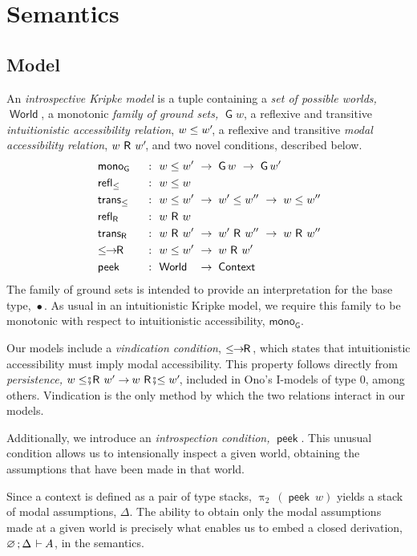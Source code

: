 \documentclass[submission,copyright,creativecommons,sharealike,backref=page]{eptcs}
\newcommand{\sA}{\mkern-2muA}
\newcommand{\R}{\mathrel{\rlap{$\mkern.75mu\textsf{R}$}\hphantom{\subseteq}}}
\newcommand{\Rs}{\mathrel{\textsf{R}}}
\renewcommand{\:}{\mathop{\mkern3mu:\mkern3mu}}
\renewcommand{\.}{\mathop{\mkern3mu.\mkern3mu}}
\renewcommand{\;}{\mathop{;}}
\renewcommand{\,}{\mathop{,}}
\newcommand{\e}{\mathrel{\mkern2mu\vdash\mkern1mu}}
\renewcommand{\r}{\mathrel{\rightarrow\mkern-1mu}}
\newcommand{\peek}{\operatorname{\textsf{peek}}}
\newcommand{\piii}{\operatorname{\uppi_{\scriptscriptstyle{2}}}}
\newcommand{\reflle}{\operatorname{\textsf{refl}_{\le}}}
\newcommand{\reflR}{\operatorname{\textsf{refl}_{\Rs}}}
\newcommand{\transle}{\operatorname{\textsf{trans}_{\le}}}
\newcommand{\transR}{\operatorname{\textsf{trans}_{\Rs}}}
\newcommand{\s}{\fatsemi}
\newcommand{\Rsle}{\mathrel{\R\mkern-4mu\s\mkern-4mu\le}}
\newcommand{\lesR}{\mathrel{\le\mkern-4mu\s\mkern-4mu\R}}
\newcommand{\lerR}{\operatorname{\le\mkern-1mu\r\mkern-1mu\R}}
\newcommand{\Context}{\operatorname{\textsf{Context}}}
\newcommand{\World}{\operatorname{\textsf{World}}}
\newcommand{\G}{\operatorname{\textsf{G}}}
\newcommand{\monoG}{\operatorname{\textsf{mono}_{\G}}}
\newcommand{\base}{\mathop{\bullet}}
\renewcommand{\O}{\varnothing}
\theoremstyle{mystyle}
\begin{document}
\section{Semantics}\label{Semantics}

\subsection{Model}

An \emph{introspective Kripke model} is a tuple containing a \emph{set of possible worlds,} $\World$, a monotonic \emph{family of ground sets,} $\G w$, a reflexive and transitive \emph{intuitionistic accessibility relation}, $w \le w'\mkern-3mu$, a reflexive and transitive \emph{modal accessibility relation}, $w \R w'\mkern-3mu$, and two novel conditions, described below.
\begin{alignat*}{2}
  & \monoG   && ~\:~ w \le w' ~\r~ \G w ~\r~ \G w'\\
  & \reflle  && ~\:~ w \le w\\
  & \transle && ~\:~ w \le w' ~\r~ w' \le w'' ~\r~ w \le w''\\
  & \reflR   && ~\:~ w \R w\\
  & \transR  && ~\:~ w \R w' ~\r~ w' \R w'' ~\r~ w \R w''\\
  & \lerR    && ~\:~ w \le w' ~\r~ w \R w'\\
  & \peek    && ~\:~ \rlap{$\World$}\hphantom{w \le w'} ~\r~ \Context
\end{alignat*}
The family of ground sets is intended to provide an interpretation for the base type, $\base$.  As usual in an intuitionistic Kripke model, we require this family to be monotonic with respect to intuitionistic accessibility, $\monoG$.

Our models include a \emph{vindication condition}, $\lerR$, which states that intuitionistic accessibility must imply modal accessibility.  This property follows directly from \emph{persistence,} $w \lesR w' \r w \Rsle w'\mkern-3mu$, included in Ono's\cite{Ono77} I-models of type 0, among others.  Vindication is the only method by which the two relations interact in our models.

Additionally, we introduce an \emph{introspection condition,} $\peek$.  This unusual condition allows us to intensionally inspect a given world, obtaining the assumptions that have been made in that world.

Since a context is defined as a pair of type stacks, $\piii~(\peek~w)$ yields a stack of modal assumptions, $\Delta$.  The ability to obtain only the modal assumptions made at a given world is precisely what enables us to embed a closed derivation, $\O \; \Delta \e \sA$, in the semantics.
\end{document}
